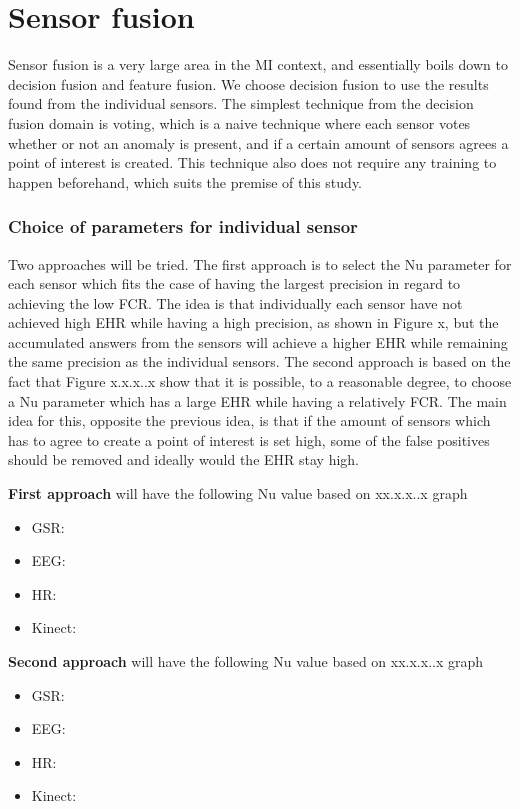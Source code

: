 \section{Sensor fusion}
Sensor fusion is a very large area in the MI context, and essentially boils down to decision fusion and feature fusion. 
We choose decision fusion to use the results found from the individual sensors.
The simplest technique from the decision fusion domain is voting, which is a naive technique where each sensor votes whether or not an anomaly is present, and if a certain amount of sensors agrees a point of interest is created. This technique also does not require any training to happen beforehand, which suits the premise of this study.

\subsubsection{Choice of parameters for individual sensor}
Two approaches will be tried. The first approach is to select the Nu parameter for each sensor which fits the case of having the largest precision in regard to achieving the low FCR. The idea is that individually each sensor have not achieved high EHR while having a high precision, as shown in Figure x, but the accumulated answers from the sensors will achieve a higher EHR while remaining the same precision as the individual sensors.
The second approach is based on the fact that Figure x.x.x..x show that it is possible, to a reasonable degree, to choose a Nu parameter which has a large EHR while having a relatively FCR. The main idea for this, opposite the previous idea, is that if the amount of sensors which has to agree to create a point of interest is set high, some of the false positives should be removed and ideally would the EHR stay high.

\textbf{First approach} will have the following Nu value based on xx.x.x..x graph
\begin{itemize}
\item GSR:
\item EEG:
\item HR:
\item Kinect:
\end{itemize}
\textbf{Second approach} will have the following Nu value based on xx.x.x..x graph
\begin{itemize}
\item GSR:
\item EEG:
\item HR:
\item Kinect:
\end{itemize}




